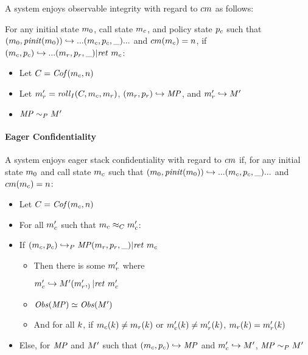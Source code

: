 \documentclass[conference]{IEEEtran}
\begin{document}
      A system enjoys observable integrity with regard to \(cm\) as follows:

      For any initial state \(m_0\), call state \(m_c\), and policy state \(p_c\) such that
      \((m_0,\mathit{pinit}(m_0)) \hookrightarrow ... (m_c,p_c,\_) ...\)
      and \(cm(m_c) = n\), if \((m_c,p_c) \hookrightarrow ...
        (m_r,p_r,\_) | \mathit{ret}\ m_c\):

          \begin{itemize}
            \item Let \(C = \mathit{Cof}(m_c,n)\)
            \item Let \(m_r' = \mathit{roll}_I(C,m_c,m_r)\), \((m_r,p_r)
              \hookrightarrow \mathit{MP}\), and \(m_r' \hookrightarrow M'\)
            \item \(\mathit{MP} \sim_P M'\)
          \end{itemize}
    
    \paragraph{Eager Confidentiality}

      A system enjoys eager stack confidentiality with regard to \(cm\) if, for any initial state
      \(m_0\) and call state \(m_c\) such that
      \((m_0,\mathit{pinit}(m_0)) \hookrightarrow ... (m_c,p_c,\_) ...\) and
      \(cm(m_c) = n\):

      \begin{itemize}
        \item Let \(C = \mathit{Cof}(m_c,n)\)
        \item For all \(m_c'\) such that \(m_c \approx_C m_c'\):
        \item If \((m_c,p_c) \hookrightarrow_P \mathit{MP} (m_r,p_r,\_) | \mathit{ret}\ m_c\)
          \begin{itemize}
            \item Then there is some \(m_r'\) where
              
              \(m_c' \hookrightarrow M' (m_r',_) | \mathit{ret}\ m_c'\)
            \item \(\mathit{Obs}(\mathit{MP}) \simeq \mathit{Obs}(M')\)
            \item And for all \(k\), if \(m_c(k) \not = m_r(k)\) or
              \(m_c'(k) \not = m_r'(k)\), \(m_r(k) = m_r'(k)\)
          \end{itemize}
        \item Else, for \(\mathit{MP}\) and \(M'\) such that \((m_c,p_c) \hookrightarrow \mathit{MP}\)
          and \(m_c' \hookrightarrow M'\), \(\mathit{MP} \sim_P M'\)
      \end{itemize}
\end{document}
